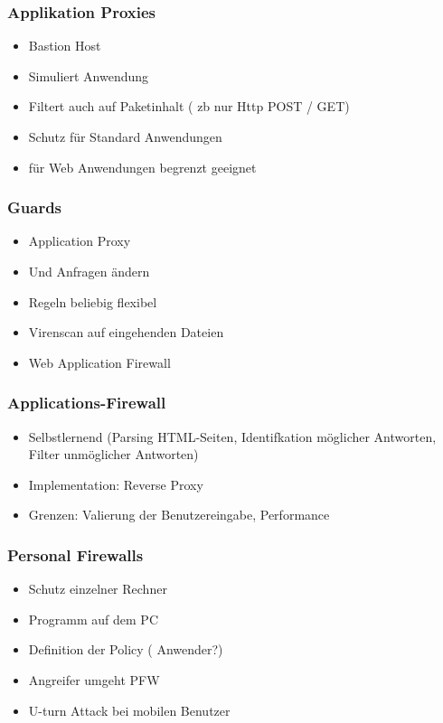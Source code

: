 \subsubsection*{ Applikation Proxies }
\begin{itemize}
	\item Bastion Host
	\item Simuliert Anwendung
	\item Filtert auch auf Paketinhalt ( zb nur Http POST / GET)
	\item Schutz für Standard Anwendungen
	\item für Web Anwendungen begrenzt geeignet
\end{itemize}

\subsubsection*{ Guards }
\begin{itemize}
	\item Application Proxy
	\item Und Anfragen ändern
	\item Regeln beliebig flexibel
	\item Virenscan auf eingehenden Dateien
	\item Web Application Firewall
\end{itemize}

\subsubsection*{ Applications-Firewall }
\begin{itemize}
	\item Selbstlernend (Parsing HTML-Seiten, Identifkation möglicher Antworten, Filter unmöglicher Antworten)
	\item Implementation: Reverse Proxy 
	\item Grenzen: Valierung der Benutzereingabe, Performance
\end{itemize}

\subsubsection*{ Personal Firewalls }
\begin{itemize}
	\item Schutz einzelner Rechner
	\item Programm auf dem PC
	\item Definition der Policy ( Anwender?)
	\item Angreifer umgeht PFW
	\item U-turn Attack bei mobilen Benutzer
\end{itemize}

